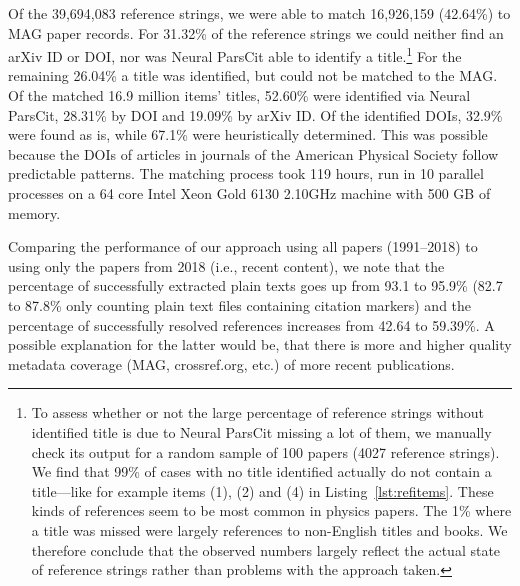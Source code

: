 Of the 39,694,083 reference strings, we were able to match 16,926,159 (42.64\%) to MAG paper records. For 31.32\% of the reference strings we could neither find an arXiv ID or DOI, nor was Neural ParsCit able to identify a title.\footnote{To assess whether or not the large percentage of reference strings without identified title is due to Neural ParsCit missing a lot of them, we manually check its output for a random sample of 100 papers (4027 reference strings). We find that 99\% of cases with no title identified actually do not contain a title---like for example items (1), (2) and (4) in Listing~\ref{lst:refitems}. These kinds of references seem to be most common in physics papers. The 1\% where a title was missed were largely references to non-English titles and books. We therefore conclude that the observed numbers largely reflect the actual state of reference strings rather than problems with the approach taken.} For the remaining 26.04\% a title was identified, but could not be matched to the MAG.
Of the matched 16.9 million items' titles, 52.60\% were identified via Neural ParsCit, 28.31\% by DOI and 19.09\% by arXiv ID. Of the identified DOIs, 32.9\% were found as is, while 67.1\% were heuristically determined. This was possible because the DOIs of articles in journals of the American Physical Society follow predictable patterns. The matching process took 119 hours, run in 10 parallel processes on a 64 core Intel Xeon Gold 6130 2.10GHz machine with 500 GB of memory.

Comparing the performance of our approach using all papers (1991--2018) to using only the papers from 2018 (i.e., recent content), we note that the percentage of successfully extracted plain texts goes up from 93.1 to 95.9\% (82.7 to 87.8\% only counting plain text files containing citation markers) and the percentage of successfully resolved references increases from 42.64 to 59.39\%. A possible explanation for the latter would be, that there is more and higher quality metadata coverage (MAG, crossref.org, etc.) of more recent publications.

